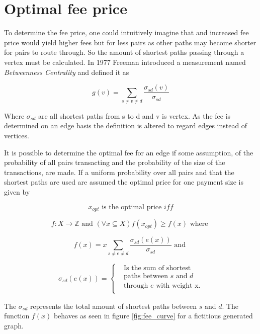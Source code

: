 \section{Optimal fee price}

To determine the fee price, one could intuitively imagine that and increased fee price would yield higher fees but for less pairs as other paths may become shorter for pairs to route through. So the amount of shortest paths passing through a vertex must be calculated. In 1977 Freeman introduced a measurement named \textit{Betweenness Centrality}\cite{freeman:betweenness:centrality} and defined it as

\[ g(v) = \sum_{s \neq v \neq d}\frac{\sigma_{sd}(v)}{\sigma_{sd}} \]

Where $\sigma_{sd}$ are all shortest paths from s to d and v is vertex. As the fee is determined on an edge basis the definition is altered to regard edges instead of vertices. 

It is possible to determine the optimal fee for an edge if some assumption, of the probability of all pairs transacting and the probability of the size of the transactions, are made. If a uniform probability over all pairs and that the shortest paths are used are assumed the optimal price for one payment size is given by

\[ x_{opt} \textrm{ is the optimal price } iff \]

\[ f: X \to \mathbb{Z} \textrm{ and } (\forall x \subseteq X)f(x_{opt}) \geqslant f(x) \textrm{ where }\]

\[ f(x) = x\sum_{s \neq e \neq d}\frac{\sigma_{sd}(e(x))}{\sigma_{sd}} \textrm{ and } \]


\[ \sigma_{sd}(e(x)) =  \begin{cases}
 & \text{Is the sum of shortest } \\
 & \text{paths between $s$ and $d$} \\
& \text{through $e$ with weight x.} \\

\end{cases} \]


The $\sigma_{sd}$ represents the total amount of shortest paths between $s$ and $d$.
The function $f(x)$ behaves as seen in figure \ref{fig:fee_curve} for a fictitious generated graph. 

